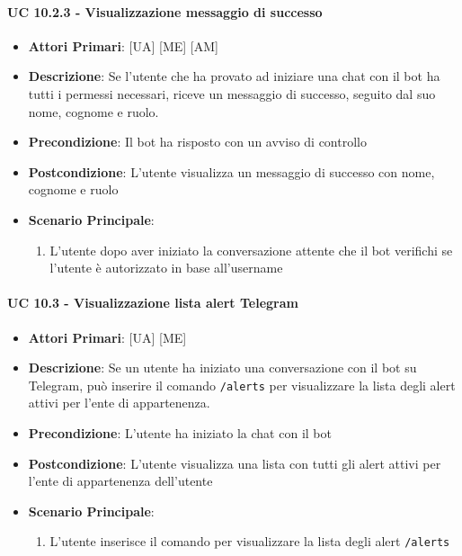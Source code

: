 			\paragraph{UC 10.2.3 - Visualizzazione messaggio di successo}
			\begin{itemize}
				\item \textbf{Attori Primari}: [UA] [ME] [AM]
				\item \textbf{Descrizione}: Se l'utente che ha provato ad iniziare una chat con il bot ha tutti i permessi necessari, riceve un messaggio di successo, seguito dal suo nome, cognome e ruolo.
				\item \textbf{Precondizione}: Il bot ha risposto con un avviso di controllo 
				\item \textbf{Postcondizione}: L'utente visualizza un messaggio di successo con nome, cognome e ruolo
				\item \textbf{Scenario Principale}:
				\begin{enumerate}
					\item{L'utente dopo aver iniziato la conversazione attente che il bot verifichi se l'utente è autorizzato in base all'username}
				\end{enumerate}	
			\end{itemize}

			\paragraph{UC 10.3 - Visualizzazione lista alert Telegram}
			\begin{itemize}
				\item \textbf{Attori Primari}: [UA] [ME]
				\item \textbf{Descrizione}: Se un utente ha iniziato una conversazione con il bot su Telegram, può inserire il comando \verb!/alerts! per visualizzare la lista degli alert attivi per l'ente di appartenenza.
				\item \textbf{Precondizione}: L'utente ha iniziato la chat con il bot
				\item \textbf{Postcondizione}: L'utente visualizza una lista con tutti gli alert attivi per l'ente di appartenenza dell'utente
				\item \textbf{Scenario Principale}:
				\begin{enumerate}
					\item{L'utente inserisce il comando per visualizzare la lista degli alert \verb!/alerts!}
				\end{enumerate}	
			\end{itemize}

